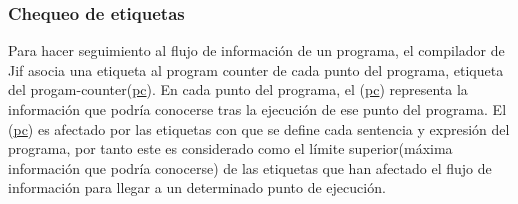 \subsubsection{Chequeo de etiquetas}
Para hacer seguimiento al flujo de información de un programa, el compilador de
Jif asocia una etiqueta al program counter de cada punto del programa,
etiqueta del progam-counter(\underline{pc}). En cada punto del programa, el
(\underline{pc}) representa la información que podría conocerse tras la
ejecución de ese punto del programa.
El (\underline{pc}) es afectado por las etiquetas con que se define cada
sentencia y expresión del programa, por tanto este es considerado como el límite
superior(máxima información que podría conocerse) de las etiquetas que han
afectado el flujo de información para llegar a un determinado punto de
ejecución.

